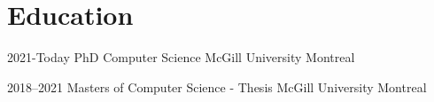
\section{Education}

    \cventry
        {2021-Today}
        {PhD Computer Science}
        {McGill University}
        {Montreal}
        {}
        {
        {
        }
    }  %

    \cventry
        {2018--2021}
        {Masters of Computer Science - Thesis}
        {McGill University}
        {Montreal}
        {}
        {
        }  %
    
